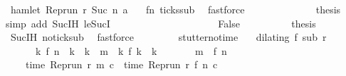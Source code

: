 \begin{isabellebody}
\ {\isacartoucheopen}{\isasymnot}\ hamlet\ {\isacharparenleft}{\isacharparenleft}Rep{\isacharunderscore}run\ r{\isacharparenright}\ {\isacharparenleft}Suc\ n{\isacharprime}{\isacharparenright}\ a{\isacharparenright}{\isacartoucheclose}\ \isamarkupfalse%
\ {\isachardoublequoteopen}{\isacharasterisk}{\isachardoublequoteclose}\ fn{}\ ticks{\isacharunderscore}sub\ \isamarkupfalse%
\ fastforce\isanewline
\ \ \ \ \ \ \ \ \ \ \ \ \isamarkupfalse%
\ {\isacharquery}thesis\ \isamarkupfalse%
\ {\isacharparenleft}simp\ add{\isacharcolon}\ Suc{\isachardot}IH\ le{\isacharunderscore}SucI{\isacharparenright}\isanewline
\ \ \ \ \ \ \ \ \isamarkupfalse%
\isanewline
\ \ \ \ \isamarkupfalse%
\isanewline
\ \ \ \ \ \ \isamarkupfalse%
\ False\isanewline
\ \ \ \ \ \ \ \ \isamarkupfalse%
\ {\isacharquery}thesis\ \ \isamarkupfalse%
\ {\isachardoublequoteopen}{\isacharasterisk}{\isachardoublequoteclose}\ Suc{\isachardot}IH\ no{\isacharunderscore}tick{\isacharunderscore}sub\ \isamarkupfalse%
\ fastforce\isanewline
\ \ \ \ \isamarkupfalse%
\isanewline
\ \ \isamarkupfalse%
\isanewline
{}\isamarkupfalse%
%
\endisatagproof
{\isafoldproof}%
%
\isadelimproof
\isanewline
%
\endisadelimproof
\isanewline
{}\isamarkupfalse%
\ stutter{\isacharunderscore}no{\isacharunderscore}time{\isacharcolon}\isanewline
\ \ \ {\isacartoucheopen}dilating\ f\ sub\ r{\isacartoucheclose}\isanewline
\ \ \ \ \ \ \ {\isacartoucheopen}{\isasymAnd}k{\isachardot}\ f\ n\ {\isacharless}\ k\ {\isasymand}\ k\ {\isasymle}\ m\ {\isasymLongrightarrow}\ {\isacharparenleft}{\isasymnexists}k\ f\ k\ {\isacharequal}\ k{\isacharparenright}{\isacartoucheclose}\isanewline
\ \ \ \ \ \ \ {\isacartoucheopen}m\ {\isachargreater}\ f\ n{\isacartoucheclose}\isanewline
\ \ \ \ \ {\isacartoucheopen}time\ {\isacharparenleft}{\isacharparenleft}Rep{\isacharunderscore}run\ r{\isacharparenright}\ m\ c{\isacharparenright}\ {\isacharequal}\ time\ {\isacharparenleft}{\isacharparenleft}Rep{\isacharunderscore}run\ r{\isacharparenright}\ {\isacharparenleft}f\ n{\isacharparenright}\ c{\isacharparenright}{\isacartoucheclose}\isanewline
%
\isadelimproof
%
\endisadelimproof
%
\isatagproof
{}\isamarkupfalse%
\ {\isacharminus}\isanewline
\ \ \isamarkupfalse%

\end{isabellebody}
